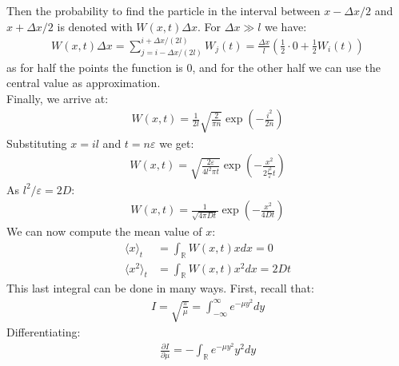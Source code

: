 \documentclass[../template.tex]{subfiles}
\begin{document}
Then the probability to find the particle in the interval between $x-\Delta x/2$ and $x+ \Delta x/2$ is denoted with $W(x,t) \Delta x$. For $\Delta x \gg l$ we have: 
\begin{align*}
    W(x,t) \Delta x = \sum_{j=i- \Delta x/(2l)}^{i+ \Delta x/(2l)} W_j(t) = \frac{\Delta x}{l} \left(\frac{1}{2} \cdot 0 + \frac{1}{2} W_i(t)\right)
\end{align*}    
as for half the points the function is $0$, and for the other half we can use the central value as approximation.\\
Finally, we arrive at: 
\begin{align*}
    W(x,t) = \frac{1}{2l} \sqrt{\frac{2}{\pi n}} \exp\left(-\frac{i^2}{2n}\right)
\end{align*}
Substituting $x=il$ and $t = n \varepsilon$ we get: 
\begin{align*}
    W(x,t) = \sqrt{\frac{2 \varepsilon}{4l^2 \pi t}} \exp \left(-\frac{x^2}{2 \frac{l^2}{\varepsilon} t}\right)
\end{align*}  
As $l^2/\varepsilon = 2D$: 
\begin{align*}
    W(x,t) = \frac{1}{\sqrt{4 \pi D t}} \exp\left(-\frac{x^2}{4Dt}\right)
\end{align*} 
We can now compute the mean value of $x$:
\begin{align*}
    \langle x \rangle_t &= \int_{\mathbb{R}} W(x,t) x dx = 0\\
    \langle x^2 \rangle_t &= \int_{\mathbb{R}} W(x,t) x^2 dx = 2Dt
\end{align*}
This last integral can be done in many ways. First, recall that: 
\begin{align*}
    I = \sqrt{\frac{\pi}{\mu}} = \int_{-\infty}^{\infty} e^{-\mu y^2}dy
\end{align*}
Differentiating: 
\begin{align*}
    \frac{\partial I}{\partial \mu} = - \int_{\mathbb{R}} e^{-\mu y^2} y^2 dy
\end{align*}

\end{document}
